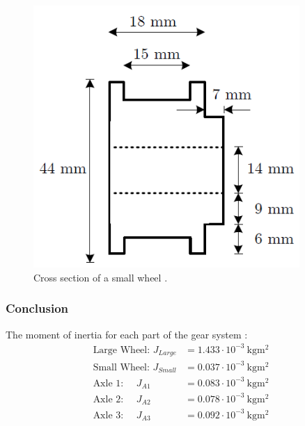 \begin{figure}[htbp]
\begin{minipage}[t]{0.45\textwidth}
        \includegraphics[width=0.9\textwidth]{figures/appendix/Motor&GearTests/SmallWheel} 
        \caption{Cross section of a small wheel \citep{web:BalancingStick2008}.}
    \end{minipage}
\end{figure}

\subsubsection*{Conclusion}
The moment of inertia for each part of the gear system \citep{web:BalancingStick2008}:
\begin{subequations} \label{eq:ResumeMomentInertiaGears}
	\begin{flalign}
		\text{Large Wheel: } J_{Large} &= 1.433 \cdot 10^{-3} \ \si{\kilo\gram\meter\squared} \\
		\text{Small Wheel: } J_{Small} &= 0.037 \cdot 10^{-3}\ \si{\kilo\gram\meter\squared} \\
		\text{Axle 1: }\quad J_{A1} &= 0.083 \cdot 10^{-3}\ \si{\kilo\gram\meter\squared} \\
		\text{Axle 2: }\quad J_{A2} &= 0.078 \cdot 10^{-3}\ \si{\kilo\gram\meter\squared} \\
		\text{Axle 3: }\quad J_{A3} &= 0.092 \cdot 10^{-3}\ \si{\kilo\gram\meter\squared} 
	\end{flalign}
\end{subequations}

